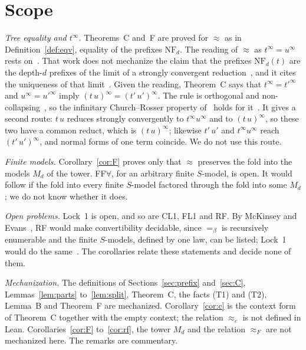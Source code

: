 \documentclass[11pt]{amsart}
\theoremstyle{definition}
\newcommand{\conv}{=_\beta}
\newcommand{\NF}{\mathrm{NF}}
\newcommand{\eqc}{\approx_c}
\newcommand{\eqF}{\approx_F}
\begin{document}
\section{Scope}\label{sec:scope}

\emph{Tree equality and $t^\infty$.} Theorems~C and~F are proved for $\approx$ as in
Definition~\ref{def:eqv}, equality of the prefixes $\NF_d$. The reading of $\approx$ as $t^\infty=u^\infty$
rests on~\citep{s3}. That work does not mechanize the claim that the prefixes $\NF_d(t)$ are the
depth-$d$ prefixes of the limit of a strongly convergent reduction~\citep[Remark~8]{s3}, and it cites
the uniqueness of that limit~\citep[Theorem~7]{s3}. Given the reading, Theorem~C says that
$t^\infty=t'^\infty$ and $u^\infty=u'^\infty$ imply $(t\,u)^\infty=(t'\,u')^\infty$. The rule is
orthogonal and non-collapsing~\citep[\S2]{s3}, so the infinitary Church--Rosser property
of~\citep{kksv} holds for it~\citep[proof of Theorem~7]{s3}. It gives a second route: $t\,u$ reduces
strongly convergently to $t^\infty u^\infty$ and to $(t\,u)^\infty$, so these two have a common reduct,
which is $(t\,u)^\infty$; likewise $t'\,u'$ and $t^\infty u^\infty$ reach $(t'\,u')^\infty$, and normal
forms of one term coincide. We do not use this route.

\emph{Finite models.} Corollary~\ref{cor:F} proves only that $\approx$ preserves the fold into the models
$M_d$ of the tower. FF$\forall$, for an arbitrary finite $S$-model, is open. It would follow if the fold
into every finite $S$-model factored through the fold into some $M_d$; we do not know whether it
does.

\emph{Open problems.} Lock~1 is open, and so are CL1, FL1 and RF. By McKinsey and
Evans~\citep{mckinsey,evans}, RF would make convertibility decidable, since $\conv$ is recursively
enumerable and the finite $S$-models, defined by one law, can be listed; Lock~1 would do the same~\citep[\S6]{s6}. The corollaries relate these statements and decide
none of them.

\emph{Mechanization.} The definitions of Sections~\ref{sec:prefix} and~\ref{sec:C}, Lemmas~\ref{lem:parts}
to~\ref{lem:split}, Theorem~C, the facts (T1) and (T2), Lemma~B and Theorem~F are mechanized.
Corollary~\ref{cor:c} is the context form of Theorem~C together with the empty context; the relation
$\eqc$ is not defined in Lean. Corollaries~\ref{cor:F} to~\ref{cor:rf}, the tower $M_d$ and the
relation $\eqF$ are not mechanized here. The remarks are commentary.
\end{document}
